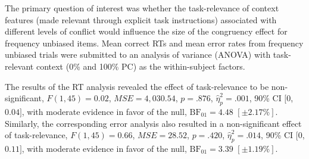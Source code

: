 \documentclass[english,,man,floatsintext]{apa6}
\begin{document}
The primary question of interest was whether the task-relevance of context features (made relevant through explicit task instructions) associated with different levels of conflict would influence the size of the congruency effect for frequency unbiased items. Mean correct RTs and mean error rates from frequency unbiased trials were submitted to an analysis of variance (ANOVA) with task-relevant context (0\% and 100\% PC) as the within-subject factors.

The results of the RT analysis revealed the effect of task-relevance to be non-significant, \(F(1, 45) = 0.02\), \(\mathit{MSE} = 4,030.54\), \(p = .876\), \(\hat{\eta}^2_p = .001\), 90\% CI \([0\), \(0.04]\), with moderate evidence in favor of the null, \(\mathrm{BF}_{\textrm{01}} = 4.48\) \([\pm 2.17\%]\). Similarly, the corresponding error analysis also resulted in a non-significant effect of task-relevance, \(F(1, 45) = 0.66\), \(\mathit{MSE} = 28.52\), \(p = .420\), \(\hat{\eta}^2_p = .014\), 90\% CI \([0\), \(0.11]\), with moderate evidence in favor of the null, \(\mathrm{BF}_{\textrm{01}} = 3.39\) \([\pm 1.19\%]\).
\end{document}

